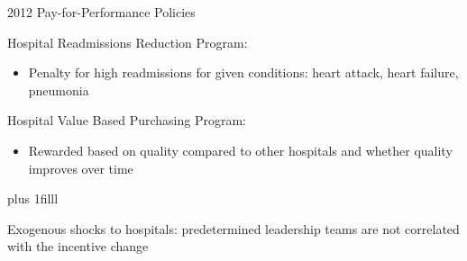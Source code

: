 \documentclass[notes,11pt, aspectratio=169]{beamer}
\newcommand{\btVFill}{\vskip0pt plus 1filll}
\begin{document}
\begin{frame}{2012 Pay-for-Performance Policies}\label{policies}
    \vspace{7mm}

    Hospital Readmissions Reduction Program:
    \begin{itemize}
        \item Penalty for high readmissions for given conditions: heart attack, heart failure, pneumonia
        
    \end{itemize}

    \vspace{5mm}

    Hospital Value Based Purchasing Program:
    \begin{itemize}
        \item Rewarded based on quality compared to other hospitals and whether quality improves over time
    \end{itemize}

    \btVFill
    
    \hyperlink{policies}{}
    
    \vspace{2mm}

    \begin{block}{}
        Exogenous shocks to hospitals: predetermined leadership teams are not correlated with the incentive change
    \end{block}
\end{frame}
\end{document}
